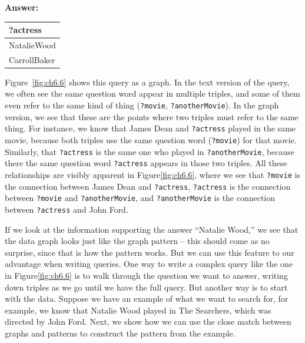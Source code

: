 \textbf{\textbf{Answer:}}

\begin{tabular}{|l|}
\hline
?actress\\
\hline
NatalieWood\\
CarrollBaker\\
\hline
\end{tabular}

Figure~\ref{fig:ch6.6} shows this query as a graph. In the text version of the
query, we often see the same question word appear in multiple triples,
and some of them even refer to the same kind of thing (\texttt{?movie},
\texttt{?anotherMovie}). In the graph version, we see that these are the points
where two triples must refer to the same thing. For instance, we know
that James Dean and \texttt{?actress} played in the same movie, because both
triples use the same question word (\texttt{?movie}) for that movie. Similarly,
that \texttt{?actress} is the same one who played in \texttt{?anotherMovie}, because there
the same question word \texttt{?actress} appears in those two triples. All these
relationships are visibly apparent in Figure\ref{fig:ch6.6}, where we see that
\texttt{?movie} is the connection between James Dean and \texttt{?actress}, \texttt{?actress} is
the connection between \texttt{?movie} and \texttt{?anotherMovie}, and \texttt{?anotherMovie} is
the connection between \texttt{?actress} and John Ford.

If we look at the information supporting the answer ``Natalie Wood,'' we
see that the data graph looks just like the graph pattern -- this should
come as no surprise, since that is how the pattern works. But we can use
this feature to our advantage when writing queries. One way to write a
complex query like the one in Figure\ref{fig:ch6.6} is to walk through the question
we want to answer, writing down triples as we go until we have the full query. But another way is to start with the
data. Suppose we have an example of what we want to search for, for
example, we know that Natalie Wood played in The Searchers, which was
directed by John Ford. Next, we show how we can use the close match
between graphs and patterns to construct the pattern from the example.


